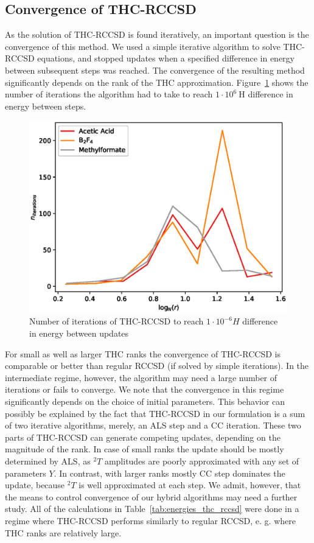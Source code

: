 \subsection{Convergence of THC-RCCSD}
As the solution of THC-RCCSD is found iteratively, an important question is 
the convergence of this method. We used a simple iterative algorithm to 
solve THC-RCCSD equations, and stopped updates when a specified difference in 
energy between subsequent steps was reached. The convergence of the resulting 
method significantly depends on the rank of the THC approximation. 
Figure~\ref{fig:cc_thc_convergence} shows the number of iterations the 
algorithm had to take to reach $1\cdot 10^{6} ~ \mathrm{H}$ difference 
in energy between steps.
%
\begin{figure}[tb]
\includegraphics[width=\columnwidth]{figures/thc_rccsd/niter_vs_logr}
\caption{Number of iterations of THC-RCCSD to reach $1 \cdot 10^{-6} H$ 
difference in energy between updates}
\label{fig:cc_thc_convergence}
\end{figure}
%
For small as well as larger THC ranks the convergence of THC-RCCSD is 
comparable or better than regular RCCSD (if solved by simple iterations). 
In the intermediate regime, however, the algorithm may need
a large number of iterations or fails to converge. We note that the 
convergence in this regime significantly depends on the choice of initial 
parameters. This behavior can possibly be explained by the fact that THC-RCCSD 
in our formulation is a sum of two iterative algorithms, merely, an ALS step 
and 
a CC iteration. These two parts of THC-RCCSD can generate competing updates, 
depending on the magnitude of the rank. In case of small ranks the update 
should be mostly determined by ALS, as ${}^{2}T$ amplitudes are poorly 
approximated with any set of parameters $Y$. In contrast, with larger ranks 
mostly CC step dominates the update, because ${}^2T$ is well 
approximated at each step. We admit, however, that the means to control 
convergence of our hybrid algorithms may need a further study. All of the 
calculations in Table~\ref{tab:energies_thc_rccsd} were done in a regime where 
THC-RCCSD 
performs similarly to regular RCCSD, e. g. where THC ranks are relatively 
large. 


